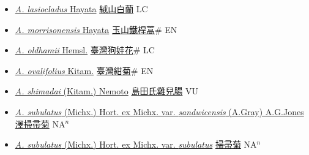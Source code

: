 \begin{itemize}
\begin{itemize}
        \item[] \href{http://www.theplantlist.org/tpl1.1/search?q=Aster+lasiocladus}{\textit{A. lasiocladus} Hayata}   \href{\detokenize{http://taibnet.sinica.edu.tw/chi/taibnet_species_list.php?T2=絨山白蘭&T2_new_value=true&fr=y}}{絨山白蘭} LC
        \item[] \href{http://www.theplantlist.org/tpl1.1/search?q=Aster+morrisonensis}{\textit{A. morrisonensis} Hayata}   \href{\detokenize{http://taibnet.sinica.edu.tw/chi/taibnet_species_list.php?T2=玉山鐵桿蒿&T2_new_value=true&fr=y}}{玉山鐵桿蒿}\# EN
        \item[] \href{http://www.theplantlist.org/tpl1.1/search?q=Aster+oldhamii}{\textit{A. oldhamii} Hemsl.}   \href{\detokenize{http://taibnet.sinica.edu.tw/chi/taibnet_species_list.php?T2=臺灣狗娃花&T2_new_value=true&fr=y}}{臺灣狗娃花}\# LC
        \item[] \href{http://www.theplantlist.org/tpl1.1/search?q=Aster+ovalifolius}{\textit{A. ovalifolius} Kitam.}   \href{\detokenize{http://taibnet.sinica.edu.tw/chi/taibnet_species_list.php?T2=臺灣紺菊&T2_new_value=true&fr=y}}{臺灣紺菊}\# EN
        \item[] \href{http://www.theplantlist.org/tpl1.1/search?q=Aster+shimadai}{\textit{A. shimadai} (Kitam.) Nemoto}   \href{\detokenize{http://taibnet.sinica.edu.tw/chi/taibnet_species_list.php?T2=島田氏雞兒腸&T2_new_value=true&fr=y}}{島田氏雞兒腸} VU
        \item[] \href{http://www.theplantlist.org/tpl1.1/search?q=Aster+subulatus+var.+sandwicensis}{\textit{A. subulatus} (Michx.) Hort. ex Michx. var. \textit{sandwicensis} (A.Gray) A.G.Jones}   \href{\detokenize{http://taibnet.sinica.edu.tw/chi/taibnet_species_list.php?T2=澤掃帚菊&T2_new_value=true&fr=y}}{澤掃帚菊} NA$^n$
        \item[] \href{http://www.theplantlist.org/tpl1.1/search?q=Aster+subulatus+var.+subulatus}{\textit{A. subulatus} (Michx.) Hort. ex Michx. var. \textit{subulatus}}   \href{\detokenize{http://taibnet.sinica.edu.tw/chi/taibnet_species_list.php?T2=掃帚菊&T2_new_value=true&fr=y}}{掃帚菊} NA$^n$

\end{itemize}
\end{itemize}

